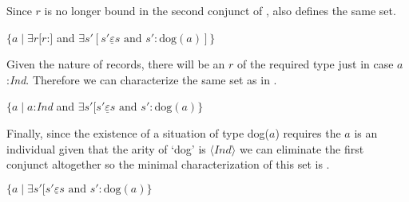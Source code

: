 Since $r$ is no longer bound in the second conjunct of \preveg{},
\nexteg{} also defines the same set.
\begin{ex} 
$\{a\mid\exists
  r[r$:$]$ and 
$\exists s'[s'\underline{\varepsilon}s \text{ and } s':\text{dog}(a)]\}$ 
\end{ex} 
Given the nature of records, there will be an $r$ of the required type
just in case $a$:\textit{Ind}.  Therefore we can characterize the same set
as in \nexteg{}.
\begin{ex} 
$\{a\mid a$:\textit{Ind} and 
$\exists s'[s'\underline{\varepsilon}s \text{ and } s':\text{dog}(a)\}$ 
\end{ex} 
Finally, since the existence of a situation of type dog($a$) requires
the $a$ is an individual given that the arity of `dog' is
$\langle\textit{Ind}\rangle$ we can eliminate the first conjunct
altogether so the minimal characterization of this set is \nexteg{}.
\begin{ex} 
$\{a\mid  
\exists s'[s'\underline{\varepsilon}s \text{ and } s':\text{dog}(a)\}$  
\end{ex} 

